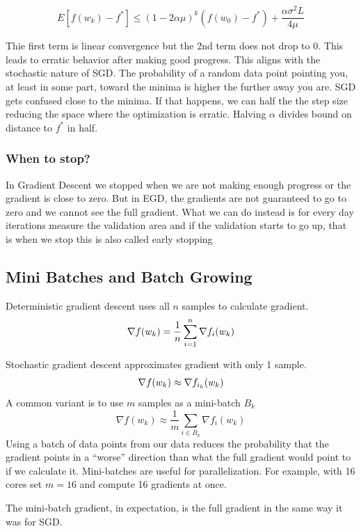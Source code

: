 \documentclass[
]{article}
\begin{document}
\[
E[f(w_k) - f^*] \leq (1 - 2\alpha\mu)^k (f(w_0) - f^*) + \frac{\alpha \sigma^2 L}{4\mu}
\]

Thie first term is linear convergence but the 2nd term does not drop to 0. This leads to erratic behavior after making good progress. This aligns with the stochastic nature of SGD. The probability of a random data point pointing you, at least in some part, toward the minima is higher the further away you are. SGD gets confused close to the minima. If that happens, we can half the the step size reducing the space where the optimization is erratic. Halving \(\alpha\) divides bound on distance to \(f^*\) in half.

\subsubsection{When to stop?}\label{when-to-stop}

In Gradient Descent we stopped when we are not making enough progress or the gradient is close to zero. But in EGD, the gradients are not guaranteed to go to zero and we cannot see the full gradient. What we can do instead is for every day iterations measure the validation area and if the validation starts to go up, that is when we stop this is also called early stopping

\subsection{Mini Batches and Batch Growing}\label{mini-batches-and-batch-growing}

Deterministic gradient descent uses all \(n\) samples to calculate gradient.
\[
\nabla f(w_k) = \frac{1}{n} \sum_{i=1}^n \nabla f_i(w_k)\\
\]

Stochastic gradient descent approximates gradient with only 1 sample.
\[
\nabla f(w_k) \approx \nabla f_{i_k}(w_k)\\
\]
A common variant is to use \(m\) samples as a mini-batch \(B_k\)
\[
\nabla f(w_k) \approx \frac{1}{m} \sum_{i \in B_k} \nabla f_i(w_k)
\]
Using a batch of data points from our data reduces the probability that the gradient points in a ``worse'' direction than what the full gradient would point to if we calculate it. Mini-batches are useful for parallelization. For example, with 16 cores set \(m = 16\) and compute 16 gradients at once.

The mini-batch gradient, in expectation, is the full gradient in the same way it was for SGD.
\end{document}
